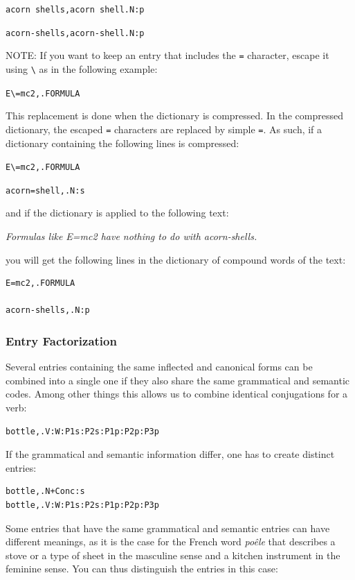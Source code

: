 \bigskip
\verb$acorn shells,acorn shell.N:p$

\verb$acorn-shells,acorn-shell.N:p$

\bigskip
\noindent NOTE: If you want to keep an entry that includes the \verb+=+
character, escape it using \verb+\+ as in the following example:

\bigskip \verb$E\=mc2,.FORMULA$

\bigskip
\noindent This replacement is done when the dictionary is compressed. In the compressed
dictionary, the escaped \verb+=+ characters are replaced by simple \verb+=+. As
such, if a dictionary containing the following lines is compressed:


\bigskip
\verb$E\=mc2,.FORMULA$

\bigskip
\verb$acorn=shell,.N:s$

\bigskip
\noindent and if the dictionary is applied to the following text:

\bigskip
\textit{Formulas like E=mc2 have nothing to do with acorn-shells.}

\bigskip \noindent you will get the following lines in the dictionary of compound
words of the text:


\begin{verbatim}
E=mc2,.FORMULA

acorn-shells,.N:p
\end{verbatim}


\subsubsection{Entry Factorization}

Several entries containing the same inflected and canonical forms can be
combined into a single one if they also share the same grammatical and semantic
codes. Among other things this allows us to combine identical conjugations for a verb:

\bigskip
\begin{verbatim}
bottle,.V:W:P1s:P2s:P1p:P2p:P3p
\end{verbatim}

\bigskip 
\noindent If the grammatical and semantic information differ, one has to create
distinct entries:

\bigskip
\begin{verbatim}
bottle,.N+Conc:s
bottle,.V:W:P1s:P2s:P1p:P2p:P3p
\end{verbatim}

\bigskip 
\noindent Some entries that have the same grammatical and semantic entries can
have different meanings, as it is the case for the French word \textit{po\^ele}
that describes a stove or a type of sheet in the masculine sense and a kitchen
instrument in the feminine sense. You can thus distinguish the entries in  this
case:

